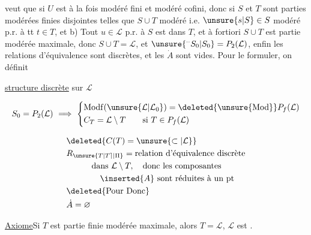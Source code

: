 
veut que si $U$  est à la fois modéré fini
et modéré cofini, donc si $S$ et $T$
sont  parties modérées finies
 disjointes telles que   $S\cup T$
modéré i.e.  $\unsure{s|S}\in S$ modéré p.r. à tt
$t\in T$, et b) Tout $u\in\mathcal L$  p.r. à
$S$ est dans $T$\unsure{;|,},  et
à fortiori $S\cup T$ est partie  modérée
maximale, donc $S\cup T=\mathcal L$, et
$\unsure{{}^{\cdot\cdot}S_0|S_0}=P_2(\mathcal L)$, enfin les relations
d'équivalence sont discrètes, et les
$\dot A$ sont vides. Pour le formuler,
on définit 

  \uline{structure  discrète} sur $\mathcal L$

\[
 S_0=P_2(\mathcal L)\ \Longrightarrow\
 \left\{\begin{aligned}
 &\mathrm{Modf}(\unsure{\mathcal L|\mathcal L_0})=\deleted{\unsure{\mathrm{Mod}}}P_f(\mathcal L)\\
 &C_T=\mathcal L\setminus T\qquad\text{si }T\in P_f(\mathcal L)
 \end{aligned}\right.
\]

\[
\begin{aligned}
 &\deleted{C(T)=\unsure{\subset|\mathcal L}}\\
 &R_{\unsure{T|T\rceil|\Pi}}=\text{relation d'équivalence discrète}\\
 &\hspace{3em}\text{dans }\mathcal L\setminus T,\quad\text{donc les composantes}\\
 &\hspace{4em} \inserted{A}\ \text{sont réduites à un pt}\\
 &\deleted{\text{Pour Donc}}\\
 &\dot A=\varnothing
\end{aligned}
\]

\uline{Axiome}\quad Si $T$ est partie finie modérée
maximale, alors $T=\mathcal L$, $\mathcal L$ est .

